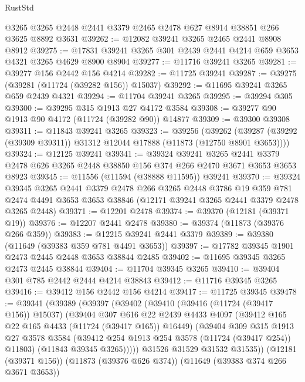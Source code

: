 \begin{lexlean}{RustStd}
\begin{coremodule}
    @3265
    @3265
    @2448
    @2441
    @3379
    @2465
    @2478
    @627
    @8914
    @38851
    @266
    @3625
    @8892
    @3631
@39262 := @12082 @39241 @3265 @2465 @2441 @8908 @8912
@39275 := @17831 @39241 @3265 @301 @2439 @2441 @4214 @659 @3653 @4321 @3265 @4629 @8900 @8904
@39277 := @11716 @39241 @3265
@39281 := @39277 @156 @2442 @156 @4214
@39282 := @11725 @39241
@39287 := @39275 (@39281 (@11724 (@39282 @156)) @15037)
@39292 := @11695 @39241 @3265 @659 @2439 @4321
@39294 := @11704 @39241 @3265
@39295 := @39294 @305
@39300 := @39295 @315 @1913 @27 @4172 @3584
@39308 := @39277 @90 @1913 @90 @4172 (@11724 (@39282 @90)) @14877
@39309 := @39300 @39308
@39311 := @11843 @39241 @3265
@39323 := @39256
    (@39262 (@39287 (@39292 (@39309 @39311)) @31312 @12044 @17888 (@11873 (@12750 @8901 @3653))))
@39324 := @12125 @39241
@39341 := @39324
    @39241
    @3265
    @2441
    @3379
    @2478
    @626
    @3265
    @2448
    @38850
    @156
    @374
    @266
    @2470
    @3671
    @3653
    @3653
    @8923
@39345 := @11556 (@11594 (@38888 @11595)) @39241
@39370 := @39324
    @39345
    @3265
    @2441
    @3379
    @2478
    @266
    @3265
    @2448
    @3786
    @19
    @359
    @781
    @2474
    @4491
    @3653
    @3653
    @38846
    (@12171 @39241 @3265 @2441 @3379 @2478 @3265 @2448)
@39371 := @12201 @2478
@39374 := @39370 (@12181 (@39371 @19))
@39376 := @12207 @2441 @2478
@39380 := @39374 (@11873 (@39376 @266 @359))
@39383 := @12215 @39241 @2441 @3379
@39389 := @39380 (@11649 (@39383 @359 @781 @4491 @3653))
@39397 := @17782 @39345 @1901 @2473 @2445 @2448 @3653 @38844 @2485
@39402 := @11695 @39345 @3265 @2473 @2445 @38844
@39404 := @11704 @39345 @3265
@39410 := @39404 @301 @785 @2442 @2444 @4214 @38843
@39412 := @11716 @39345 @3265
@39416 := @39412 @156 @2442 @156 @4214
@39417 := @11725 @39345
@39478 := @39341
    (@39389
      (@39397
        (@39402
          (@39410
            (@39416 (@11724 (@39417 @156)) @15037)
            (@39404
              @307
              @616
              @22
              @2439
              @4433
              @4097
              (@39412 @165 @22 @165 @4433 (@11724 (@39417 @165)) @16449)
              (@39404
                @309
                @315
                @1913
                @27
                @3578
                @3584
                (@39412 @254 @1913 @254 @3578 (@11724 (@39417 @254)) @11803)
                (@11843 @39345 @3265)))))
        @31526
        @31529
        @31532
        @31535))
    (@12181 (@39371 @156))
    (@11873 (@39376 @626 @374))
    (@11649 (@39383 @374 @266 @3671 @3653))

\end{coremodule}
\end{lexlean}
